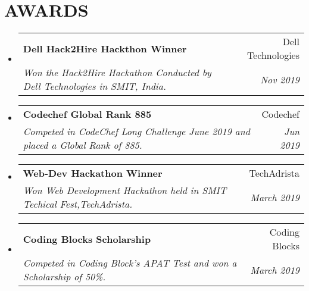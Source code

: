 \documentclass[letterpaper,11pt]{article}
\makeatletter
\newcommand{\resumeSubheading}[4]{
  \vspace{-1pt}\item
    \begin{tabular*}{0.97\textwidth}{l@{\extracolsep{\fill}}r}
      \textbf{#1} & #2 \\
      \textit{\small#3} & \textit{\small #4} \\
    \end{tabular*}\vspace{-5pt}
}
\newcommand{\resumeSubHeadingListStart}{\begin{itemize}[leftmargin=*]}
\newcommand{\resumeSubHeadingListEnd}{\end{itemize}}
\makeatother
\begin{document}
%

\section{AWARDS}
  \resumeSubHeadingListStart

    \resumeSubheading
      {Dell Hack2Hire Hackthon Winner}{Dell Technologies}
      {Won the Hack2Hire Hackathon Conducted by Dell Technologies\linebreak
      in SMIT, India.}{Nov 2019}
    \resumeSubheading
      {Codechef Global Rank 885}{Codechef}
      {Competed in CodeChef Long Challenge June 2019 and placed a Global Rank of 885.}{Jun 2019}
    \resumeSubheading
      {Web-Dev Hackathon Winner}{TechAdrista}
      {Won Web Development Hackathon held in SMIT Techical Fest,TechAdrista.}{March 2019}
    \resumeSubheading
      {Coding Blocks Scholarship}{Coding Blocks}
      {Competed in Coding Block's APAT Test and won a Scholarship of 50\%.}{March 2019}
  \resumeSubHeadingListEnd
\end{document}
